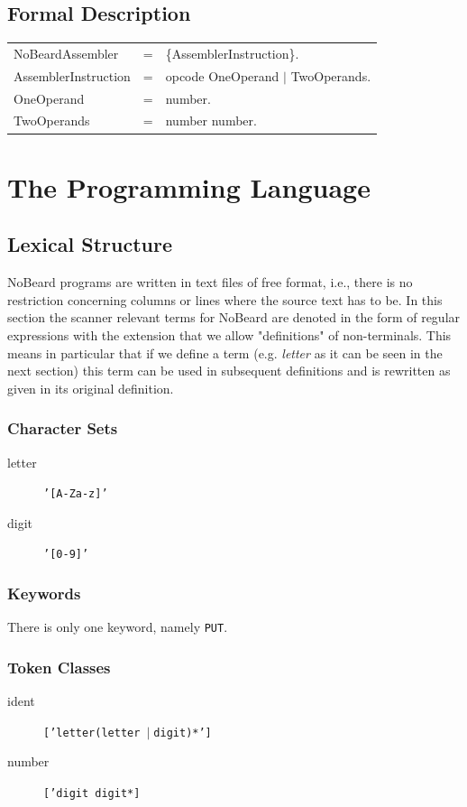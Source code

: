\documentclass[11pt]{report}
\newcommand{\leongage}{NoBeard}
\newcommand{\alternative}{$\mid \;$}
\newenvironment{grammar}[2] %
	{
		\newcommand{\completerule}[2]{##1 & = & ##2.\\}
		\newcommand{\startrule}[2]{##1 & = & ##2\\}
		\newcommand{\alternativerule}[1]{ & $|$ & ##1\\}
		\newcommand{\alternativeend}[1]{ & $|$ & ##1.\\}
		\newcommand{\finishrule}[1]{ & & ##1.\\}
		\begin{tabular}{p{#1} c p{#2}}
	}
	{	\end{tabular}
	}
\begin{document}
\section{Formal Description}

\begin{grammar}{}{}
	\completerule{NoBeardAssembler}{\{AssemblerInstruction\}}
	\completerule{AssemblerInstruction}{opcode OneOperand $|$ TwoOperands}
	\completerule{OneOperand}{number}
	\completerule{TwoOperands}{number number}
\end{grammar}

\chapter{The Programming Language}
\section{Lexical Structure}

\leongage{} programs are written in text files of free format, i.e., there is no restriction concerning columns or lines where
the source text has to be. In this section the scanner relevant terms for \leongage{} are denoted in the form of regular expressions
with the extension that we allow "definitions" of non-terminals. This means in particular that if we define a term (e.g.
{\em letter} as it can be seen in the next section) this term can be used in subsequent definitions and is rewritten as
given in its original definition.

\subsection{Character Sets}
\begin{description}
	\item[letter] \texttt{'[A-Za-z]'}
	\item[digit]\texttt{'[0-9]'}
\end{description}

\subsection{Keywords}
There is only one keyword, namely \texttt{PUT}.

\subsection{Token Classes}
\begin{description}
	\item[ident] \texttt{['letter(letter \alternative digit)*']}
	\item[number] \texttt{['digit digit*]}
\end{description}
\end{document}
